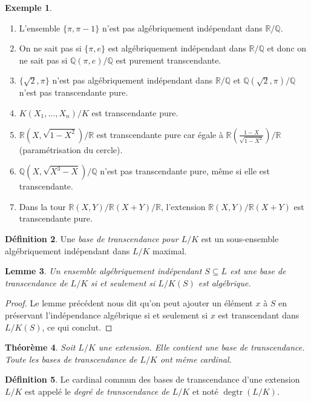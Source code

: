 \documentclass{article}
\newcommand{\Q}{\mathbb{Q}}
\newcommand{\R}{\mathbb{R}}
\DeclareMathOperator{\degtr}{degtr}
\theoremstyle{plain}
\newtheorem{theorem}{Théorème}[section]
\newtheorem{lemma}[theorem]{Lemme}
\theoremstyle{definition}
\newtheorem{definition}[theorem]{Définition}
\newtheorem{example}[theorem]{Exemple}
\theoremstyle{remark}
\begin{document}
\begin{example} \leavevmode
    \begin{enumerate}
        \item L'ensemble $\{\pi,\pi-1\}$ n'est pas algébriquement indépendant dans $\R/\Q$.
        \item On ne sait pas si $\{\pi,e\}$ est algébriquement indépendant dans $\R/\Q$ et donc on ne sait pas si $\Q(\pi,e)/\Q$ est purement transcendante.
        \item $\{\sqrt{2},\pi\}$ n'est pas algébriquement indépendant dans $\R/\Q$ et $\Q(\sqrt{2},\pi)/\Q$ n'est pas transcendante pure.
        \item $K(X_1,\dots,X_n)/K$ est transcendante pure.
        \item $\R(X,\sqrt{1-X^2})/\R$ est transcendante pure car égale à $\R\left(\frac{1-X}{\sqrt{1-X^2}}\right)/\R$ (paramétrisation du cercle).
        \item $\Q(X,\sqrt{X^3 - X})/\Q$ n'est pas transcendante pure, même si elle est transcendante.
        \item Dans la tour $\R(X,Y)/\R(X+Y)/\R$, l'extension $\R(X,Y)/\R(X+Y)$ est transcendante pure.
    \end{enumerate}
\end{example}

\begin{definition}
    Une \emph{base de transcendance pour $L/K$} est un sous-ensemble algébriquement indépendant dans $L/K$ maximal.
\end{definition}

\begin{lemma} \label{lembasetrans}
    Un ensemble algébriquement indépendant $S \subseteq L$ est une base de transcendance de $L/K$ si et seulement si $L/K(S)$ est algébrique.
\end{lemma}

\begin{proof}
    Le lemme précédent nous dit qu'on peut ajouter un élément $x$ à $S$ en préservant l'indépendance algébrique si et seulement si $x$ est transcendant dans $L/K(S)$, ce qui conclut.
\end{proof}

\begin{theorem}
    Soit $L/K$ une extension. Elle contient une base de transcendance. Toute les bases de transcendance de $L/K$ ont même cardinal.
\end{theorem}

\begin{definition}
    Le cardinal commun des bases de transcendance d'une extension $L/K$ est appelé le \emph{degré de transcendance de $L/K$} et noté $\degtr(L/K)$.
\end{definition}
\end{document}
